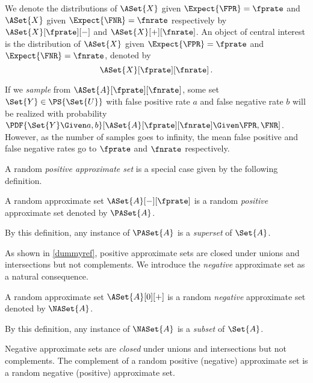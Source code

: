 \documentclass[ ../main.tex]{subfiles}
\begin{document}
We denote the distributions of $\ASet{X}$ given $\Expect{\FPR} = \fprate$ and $\ASet{X}$ given $\Expect{\FNR} = \fnrate$ respectively by $\ASet{X}[\fprate][-]$ and $\ASet{X}[+][\fnrate]$.
An object of central interest is the distribution of $\ASet{X}$ given $\Expect{\FPR} = \fprate$ and $\Expect{\FNR} = \fnrate$, denoted by
\begin{equation}
\ASet{X}[\fprate][\fnrate]\,.
\end{equation}

If we \emph{sample} from $\ASet{A}[\fprate][\fnrate]$, some set $\Set{Y} \in \PS{\Set{U}}$ with false positive rate $a$ and false negative rate $b$ will be realized with probability $\PDF{\Set{Y} \Given a, b}[\ASet{A}[\fprate][\fnrate] \Given \FPR, \FNR]$.
However, as the number of samples goes to infinity, the mean false positive and false negative rates go to $\fprate$ and $\fnrate$ respectively.

A random \emph{positive approximate set} is a special case given by the following definition.
\begin{definition}
\label{def:pos_approx_set}
A random approximate set $\ASet{A}[-][\fprate]$ is a random \emph{positive} approximate set denoted by $\PASet{A}$.
\end{definition}
By this definition, any instance of $\PASet{A}$ is a \emph{superset} of $\Set{A}$.

As shown in \cref{dummyref}, positive approximate sets are closed under unions and intersections but not complements.
We introduce the \emph{negative} approximate set as a natural consequence.
\begin{definition}
\label{def:neg_approx_set}
A random approximate set $\ASet{A}[0][+]$ is a random \emph{negative} approximate set denoted by $\NASet{A}$.
\end{definition}
By this definition, any instance of $\NASet{A}$ is a \emph{subset} of $\Set{A}$.

Negative approximate sets are \emph{closed} under unions and intersections but not complements.
The complement of a random positive (negative) approximate set is a random negative (positive) approximate set.
\end{document}
